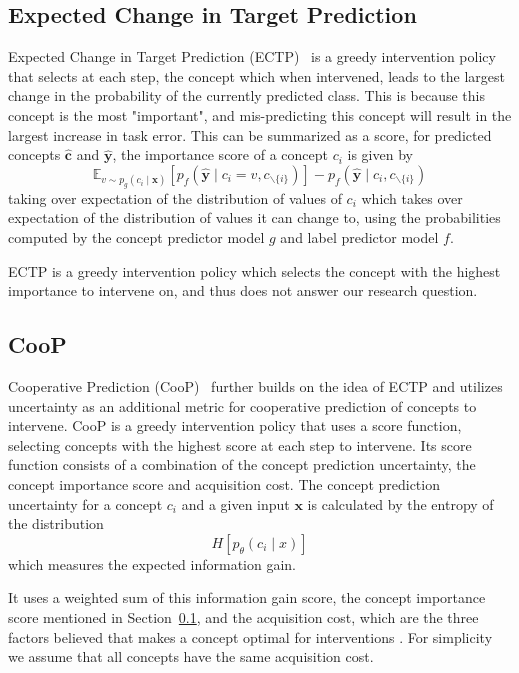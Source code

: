 \subsection{Expected Change in Target Prediction}\label{background:ectp}
Expected Change in Target Prediction (ECTP)~\cite{ectp} is a greedy 
intervention policy that selects at each step, the concept which 
when intervened, leads to the largest change in the probability
of the currently predicted class. This is because this concept
is the most "important", and mis-predicting this concept
will result in the largest increase in task error. This can be 
summarized as a score, for predicted concepts $\hat{\mathbf{c}}$
and $\hat{\mathbf{y}}$, the importance score of a concept $c_i$ is given by
\[\mathbb{E}_{v \sim p_g(c_i \mid \mathbf{x})} 
[p_f(\hat{\mathbf{y}} \mid c_i = v, c_{\backslash\{i\}})] - p_f(\hat{\mathbf{y}} \mid c_i, c_{\backslash\{i\}})
\]
taking over expectation of the distribution of values of $c_i$
which takes over expectation of the distribution of values it can change to,
using the probabilities computed by the concept predictor model
$g$ and label predictor model $f$.


ECTP is a greedy intervention policy which selects the 
concept with the highest importance to intervene on,
and thus does not answer our research question.

\subsection{CooP}\label{background:coop}
Cooperative Prediction (CooP)~\cite{coop} 
further builds on the idea of ECTP and utilizes
uncertainty as an additional metric for cooperative prediction of 
concepts to intervene.
CooP is a greedy intervention policy that 
uses a score function,
selecting concepts with the highest score at each step
to intervene.
Its score function consists of a combination of the concept prediction
uncertainty, the concept importance score and acquisition cost.
The concept prediction uncertainty for a concept $c_i$
and a given input $\mathbf{x}$ is calculated by the entropy
of the distribution
\[H [p_\theta(c_i \mid x)] \]
which measures the expected information gain.

It uses a weighted sum of this information gain score,
the concept importance score mentioned in Section~\ref{background:ectp},
and the acquisition cost, which are the three factors believed that 
makes a concept optimal for interventions
. For simplicity we assume that all concepts have the same acquisition cost.

